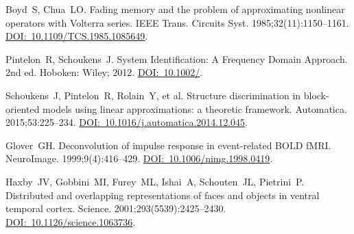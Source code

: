 \documentclass[11pt,twoside,a4paper]{article}
\begin{document}
{\begin{ltrtq}
	{Boyd~S, Chua~LO.} Fading memory and the problem of approximating nonlinear operators with Volterra series. {IEEE Trans. Circuits Syst}. 1985;32(11):1150--1161. \href{https://doi.org/10.1109/TCS.1985.1085649}{DOI:~10.1109/\allowbreak TCS.1985.1085649}.

	{Pintelon~R, Schoukens~J.} System Identification: A Frequency Domain Approach. 2nd ed. Hoboken: Wiley; 2012. \href{https://doi.org/10.1002/9781118287422}{DOI:~10.1002/}.

	{Schoukens~J, Pintelon~R, Rolain~Y, et al.} Structure discrimination in block-oriented models using linear approximations: a theoretic framework. {Automatica}. 2015;53:225--234. \href{https://doi.org/10.1016/j.automatica.2014.12.045}{DOI:~10.1016/\allowbreak j.automatica.2014.12.045}.

	{Glover~GH.} Deconvolution of impulse response in event-related BOLD fMRI. {NeuroImage}. 1999;9(4):416--429. \href{https://doi.org/10.1006/nimg.1998.0419}{DOI:~10.1006/\allowbreak nimg.1998.0419}.

	{Haxby~JV, Gobbini~MI, Furey~ML, Ishai~A, Schouten~JL, Pietrini~P.} Distributed and overlapping representations of faces and objects in ventral temporal cortex. {Science}. 2001;293(5539):2425--2430. \href{https://doi.org/10.1126/science.1063736}{DOI:~10.1126/science.1063736}.

\end{ltrtq}
}

\vspace{0.5\baselineskip}
\end{document}
